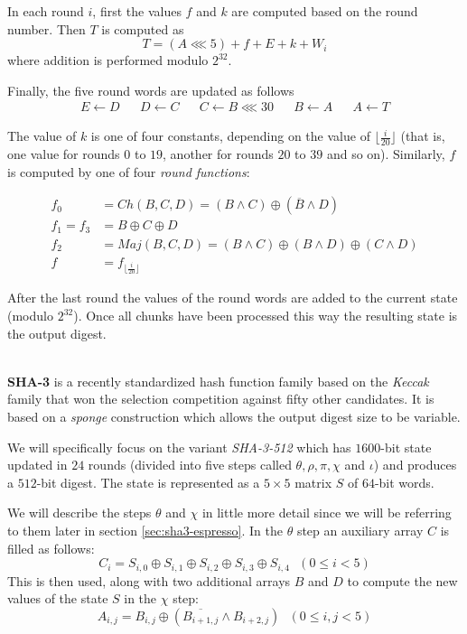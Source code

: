 In each round $i$, first the values $f$ and $k$ are computed based on the round number.
Then $T$ is computed as
\[
T = (A \lll 5) + f + E + k + W_i
\]
where addition is performed modulo $2^{32}$.

Finally, the five round words are updated as follows
\begin{align*}
E \gets D& &D \gets C& &C \gets B \lll 30& &B \gets A& &A \gets T
\end{align*}

The value of $k$ is one of four constants, depending on the value of $\lfloor \frac{i}{20} \rfloor$ (that is, one value for rounds $0$ to $19$, another for rounds $20$ to $39$ and so on).
Similarly, $f$ is computed by one of four \emph{round functions}:

\begin{align*}
f_0 &= Ch(B, C, D) = (B \land C) \oplus (\overline{B} \land D) \\
f_1 = f_3 &= B \oplus C \oplus D \\
f_2 &= Maj(B, C, D) = (B \land C) \oplus (B \land D) \oplus (C \land D)\\
f &= f_{\lfloor \frac{i}{20} \rfloor}
\end{align*}

After the last round the values of the round words are added to the current state (modulo $2^{32}$).
Once all chunks have been processed this way the resulting state is the output digest.

~\\

\textbf{SHA-3} is a recently standardized \cite{NIST2015FIPS202} hash function family based on the \emph{Keccak} family \cite{bertoni2011keccak} that won the selection competition against fifty other candidates.
It is based on a \emph{sponge} construction which allows the output digest size to be variable.

We will specifically focus on the variant \emph{SHA-3-512} which has $1600$-bit state updated in $24$ rounds (divided into five steps called $\theta, \rho, \pi, \chi$ and $\iota$) and produces a $512$-bit digest.
The state is represented as a $5\times 5$ matrix $S$ of $64$-bit words.

We will describe the steps $\theta$ and $\chi$ in little more detail since we will be referring to them later in section \ref{sec:sha3-espresso}.
In the $\theta$ step an auxiliary array $C$ is filled as follows:
\[
C_i = S_{i,0} \oplus S_{i,1} \oplus S_{i,2} \oplus S_{i,3} \oplus S_{i,4} ~~~ (0 \le i < 5)
\]
This is then used, along with two additional arrays $B$ and $D$ to compute the new values of the state $S$ in the $\chi$ step:
\[
A_{i,j} = B_{i,j} \oplus (\overline{B_{i+1,j}} \land B_{i+2,j}) ~~~ (0 \le i,j < 5)
\]

